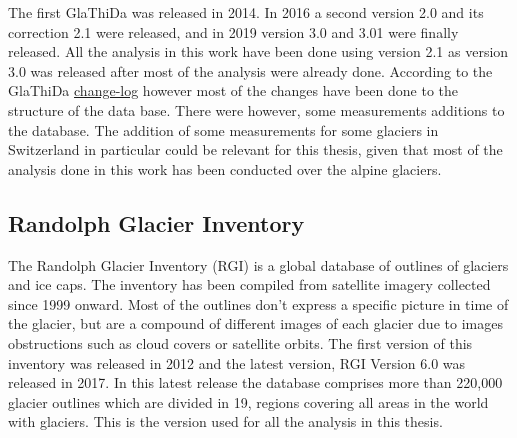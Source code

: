 The first GlaThiDa was released in 2014. In 2016 a second version 2.0 and its correction 2.1 were released, and in 2019 version 3.0 and 3.01 were finally released. All the analysis in this work have been done using version 2.1 as version 3.0 was released after most of the analysis were already done. According to the GlaThiDa \href{https://github.com/ezwelty/glathida/blob/master/CHANGELOG.md}{change-log} however most of the changes have been done to the structure of the data base. There were however, some measurements additions to the database. The addition of some measurements for some glaciers in Switzerland in particular could be relevant for this thesis, given that most of the analysis done in this work has been conducted over the alpine glaciers. 

\subsection{Randolph Glacier Inventory}\label{rgi}
The Randolph Glacier Inventory (RGI) \citep{RGI2014} is a global database of outlines of glaciers and ice caps. The inventory has been compiled from satellite imagery collected since 1999 onward. Most of the outlines don't express a specific picture in time of the glacier, but are a compound of different images of each glacier due to images obstructions such as cloud covers or satellite orbits. The first version of this inventory was released in 2012 and the latest version, RGI Version 6.0 was released in 2017. In this latest release the database comprises more than 220,000 glacier outlines which are divided in 19, regions covering all areas in the world with glaciers. This is the version used for all the analysis in this thesis. 


